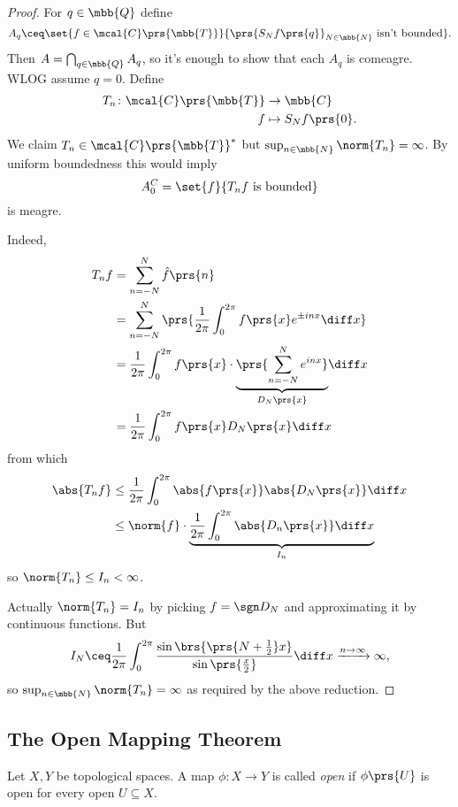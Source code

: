 \documentclass[10pt, twoside]{book}
\begin{document}
\begin{proof}
For $q \in \mbb{Q}$ define
\[A_q \ceq \set{f \in \mcal{C}\prs{\mbb{T}}}{\prs{S_N f\prs{q}}_{N \in \mbb{N}} \text{ isn't bounded}} \text{.}\]
Then $A = \bigcap_{q \in \mbb{Q}} A_q$, so it's enough to show that each $A_q$ is comeagre. WLOG assume $q = 0$.
Define
\begin{align*}
T_n \colon \mcal{C}\prs{\mbb{T}} &\to \mbb{C} \\
f &\mapsto S_N f\prs{0} \text{.}
\end{align*}
We claim $T_n \in \mcal{C}\prs{\mbb{T}}^*$ but $\sup_{n \in \mbb{N}} \norm{T_n} = \infty$.
By uniform boundedness this would imply
\[A_0^C = \set{f}{T_n f \text{ is bounded}}\]
is meagre.

Indeed,
\begin{align*}
T_n f &=
\sum_{n = -N}^N \hat{f}\prs{n}
\\&=
\sum_{n = -N}^N \prs{\frac{1}{2 \pi} \int_0^{2 \pi} f\prs{x} e^{\pm inx} \diff x}
\\&=
\frac{1}{2 \pi} \int_0^{2 \pi} f\prs{x} \cdot \underset{D_N\prs{x}}{\underbrace{\prs{\sum_{n = -N}^N e^{inx}}}} \diff x
\\&=
\frac{1}{2 \pi} \int_0^{2 \pi} f\prs{x} D_N\prs{x} \diff x
\end{align*}
from which
\begin{align*}
\abs{T_n f} &\leq
\frac{1}{2 \pi} \int_0^{2 \pi} \abs{f\prs{x}} \abs{D_N\prs{x}} \diff x
\\&\leq
\norm{f} \cdot \underset{I_n}{\underbrace{\frac{1}{2\pi} \int_0^{2 \pi} \abs{D_n\prs{x}} \diff x}}
\end{align*}
so $\norm{T_n} \leq I_n < \infty$.

Actually $\norm{T_n} = I_n$ by picking $f = \sgn D_N$ and approximating it by continuous functions.
But
\begin{align*}
I_N \ceq \frac{1}{2 \pi} \int_0^{2 \pi} \frac{\sin \brs{\prs{N + \frac{1}{2}} x}}{\sin\prs{\frac{x}{2}}} \diff x \xrightarrow{n \to \infty} \infty \text{,}
\end{align*}
so $\sup_{n \in \mbb{N}} \norm{T_n} = \infty$ as required by the above reduction.
\end{proof}


\subsection{The Open Mapping Theorem}

\begin{definition}
Let $X,Y$ be topological spaces. A map $\phi \colon X \to Y$ is called \emph{open} if $\phi\prs{U}$ is open for every open $U \subseteq X$.
\end{definition}
\end{document}
